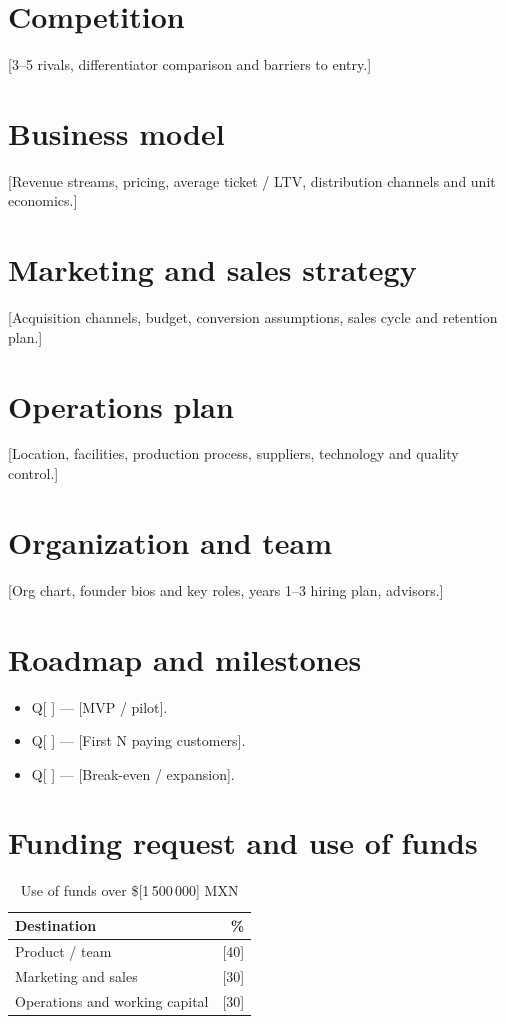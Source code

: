 \documentclass[12pt]{article}
\newcommand{\MontoSolicitado}{[1\,500\,000]}
\newcommand{\Moneda}{MXN}
\begin{document}
\section{Competition}
[3–5 rivals, differentiator comparison and barriers to entry.]

\section{Business model}
[Revenue streams, pricing, average ticket / LTV, distribution channels and
unit economics.]

\section{Marketing and sales strategy}
[Acquisition channels, budget, conversion assumptions, sales cycle and
retention plan.]

\section{Operations plan}
[Location, facilities, production process, suppliers, technology and
quality control.]

\section{Organization and team}
[Org chart, founder bios and key roles, years 1–3 hiring plan, advisors.]

\section{Roadmap and milestones}
\begin{itemize}
  \item Q[ ] — [MVP / pilot].
  \item Q[ ] — [First N paying customers].
  \item Q[ ] — [Break-even / expansion].
\end{itemize}

\section{Funding request and use of funds}
\begin{table}[h]
  \centering
  \caption{Use of funds over \$\MontoSolicitado{} \Moneda{}}
  \begin{tabular}{lr}
    \toprule
    Destination & \% \\
    \midrule
    Product / team & [40] \\
    Marketing and sales & [30] \\
    Operations and working capital & [30] \\
    \bottomrule
  \end{tabular}
\end{table}
\end{document}
